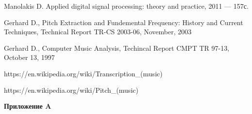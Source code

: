 \documentclass[oneside, final, 14pt]{extarticle}
\begin{document}
\cleardoublepage
{}
\begin{thebibliography}{0}

	 Manolakis D. Applied digital signal
		processing: theory and practice, 2011 --- 157с.


	 Gerhard D., Pitch Extraction and Fundemental Frequency:
		History and Current Techniques, Technical Report TR-CS 2003-06, November, 2003

	 Gerhard D., Computer Music Analysis, Techincal Report CMPT
		TR 97-13, October 13, 1997

	 https://en.wikipedia.org/wiki/Transcription\_(music)

	 https://en.wikipedia.org/wiki/Pitch\_(music)

\end{thebibliography}

\cleardoublepage
\appendix
{\large \bf Приложение A} \\
\end{document}
